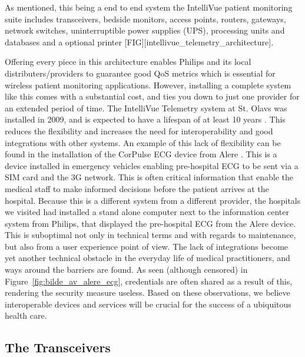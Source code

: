 As mentioned, this being a end to end system the IntelliVue patient monitoring suite includes transceivers, bedside monitors, access points, routers, gateways, network switches, uninterruptible power supplies (UPS), processing units and databases and a optional printer [FIG][intellivue_telemetry_architecture].

Offering every piece in this architecture enables Philips and its local distributers/providers to guarantee good QoS metrics which is essential for wireless patient monitoring applications. However, installing a complete system like this comes with a substantial cost, and ties you down to just one provider for an extended period of time. The IntelliVue Telemetry system at St. Olavs was installed in 2009, and is expected to have a lifespan of at least 10 years \cite{samtale_med_medtek_st_olavs_21}. This reduces the flexibility and increases the need for interoperability and good integrations with other systems. An example of this lack of flexibility can be found in the installation of the CorPulse ECG device from Alere \cite{alere}. This is a device installed in emergency vehicles enabling pre-hospital ECG to be sent via a SIM card and the 3G network. This is often critical information that enable the medical staff to make informed decisions before the patient arrives at the hospital. Because this is a different system from a different provider, the hospitals we visited had installed a stand alone computer next to the information center system from Philips, that displayed the pre-hospital ECG from the Alere device. This is suboptimal not only in technical terms and with regards to maintenance, but also from a user experience point of view. The lack of integrations become yet another technical obstacle in the everyday life of medical practitioners, and ways around the barriers are found. As seen (although censored) in Figure~\ref{fig:bilde_av_alere_ecg}, credentials are often shared as a result of this, rendering the security measure useless. Based on these observations, we believe interoperable devices and services will be crucial for the success of a ubiquitous health care.


\subsection{The Transceivers} %
\label{sub:the_transceivers}

